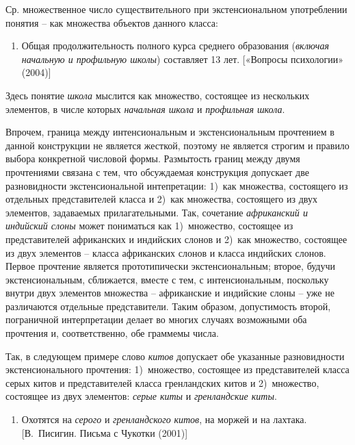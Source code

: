 Ср. множественное число существительного при экстенсиональном
употреблении понятия -- как множества объектов данного класса:

\begin{enumerate}
\def\labelenumi{(\arabic{enumi})}
\setcounter{enumi}{148}
\item
  Общая продолжительность полного курса среднего образования
  (\emph{включая начальную и профильную школы}) составляет 13 лет.
  {[}«Вопросы психологии» (2004){]}
\end{enumerate}

Здесь понятие \emph{школа} мыслится как множество, состоящее из
нескольких элементов, в числе которых \emph{начальная школа} и
\emph{профильная школа}.

Впрочем, граница между интенсиональным и экстенсиональным прочтением в
данной конструкции не является жесткой, поэтому не является строгим и
правило выбора конкретной числовой формы. Размытость границ между двумя
прочтениями связана с тем, что обсуждаемая конструкция допускает две
разновидности экстенсиональной интепретации: 1)~как множества,
состоящего из отдельных представителей класса и 2)~как множества,
состоящего из двух элементов, задаваемых прилагательными. Так, сочетание
\emph{африканский и индийский слоны} может пониматься как 1)~множество,
состоящее из представителей африканских и индийских слонов и 2)~как
множество, состоящее из двух элементов -- класса африканских слонов и
класса индийских слонов. Первое прочтение является прототипически
экстенсиональным; второе, будучи экстенсиональным, сближается, вместе с
тем, с интенсиональным, поскольку внутри двух элементов множества --
африканские и индийские слоны -- уже не различаются отдельные
представители. Таким образом, допустимость второй, пограничной
интерпретации делает во многих случаях возможными оба прочтения и,
соответственно, обе граммемы числа.

Так, в следующем примере слово \emph{китов} допускает обе указанные
разновидности экстенсионального прочтения: 1)~множество, состоящее из
представителей класса серых китов и представителей класса гренландских
китов и 2)~множество, состоящее из двух элементов: \emph{серые киты} и
\emph{гренландские киты}.

\begin{enumerate}
\def\labelenumi{(\arabic{enumi})}
\setcounter{enumi}{149}
\item
  Охотятся на \emph{серого} и \emph{гренландского} \emph{китов}, на
  моржей и на лахтака. {[}В.~Писигин. Письма с Чукотки (2001){]}
\end{enumerate}

